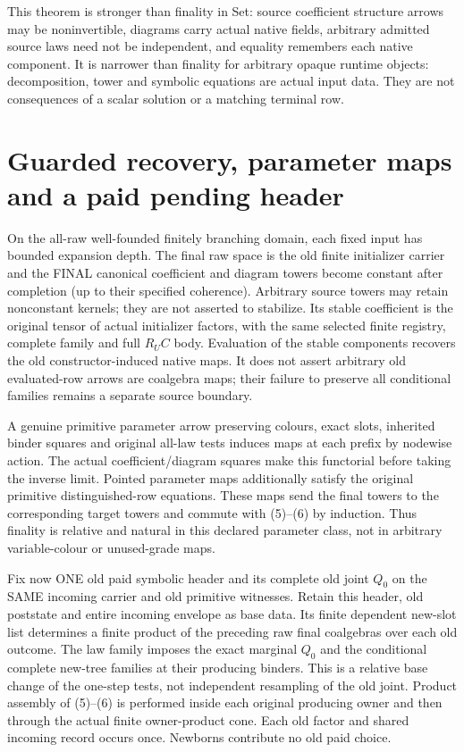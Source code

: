 \documentclass[11pt]{article}
\begin{document}
This theorem is stronger than finality in Set: source coefficient structure arrows may be noninvertible, diagrams carry actual native fields, arbitrary admitted source laws need not be independent, and equality remembers each native component. It is narrower than finality for arbitrary opaque runtime objects: decomposition, tower and symbolic equations are actual input data. They are not consequences of a scalar solution or a matching terminal row.

\section{Guarded recovery, parameter maps and a paid pending header}
On the all-raw well-founded finitely branching domain, each fixed input has bounded expansion depth. The final raw space is the old finite initializer carrier and the FINAL canonical coefficient and diagram towers become constant after completion (up to their specified coherence). Arbitrary source towers may retain nonconstant kernels; they are not asserted to stabilize. Its stable coefficient is the original tensor of actual initializer factors, with the same selected finite registry, complete family and full $R_UC$ body. Evaluation of the stable components recovers the old constructor-induced native maps. It does not assert arbitrary old evaluated-row arrows are coalgebra maps; their failure to preserve all conditional families remains a separate source boundary.

A genuine primitive parameter arrow preserving colours, exact slots, inherited binder squares and original all-law tests induces maps at each prefix by nodewise action. The actual coefficient/diagram squares make this functorial before taking the inverse limit. Pointed parameter maps additionally satisfy the original primitive distinguished-row equations. These maps send the final towers to the corresponding target towers and commute with (5)--(6) by induction. Thus finality is relative and natural in this declared parameter class, not in arbitrary variable-colour or unused-grade maps.

Fix now ONE old paid symbolic header and its complete old joint $Q_0$ on the SAME incoming carrier and old primitive witnesses. Retain this header, old poststate and entire incoming envelope as base data. Its finite dependent new-slot list determines a finite product of the preceding raw final coalgebras over each old outcome. The law family imposes the exact marginal $Q_0$ and the conditional complete new-tree families at their producing binders. This is a relative base change of the one-step tests, not independent resampling of the old joint. Product assembly of (5)--(6) is performed inside each original producing owner and then through the actual finite owner-product cone. Each old factor and shared incoming record occurs once. Newborns contribute no old paid choice.
\end{document}
